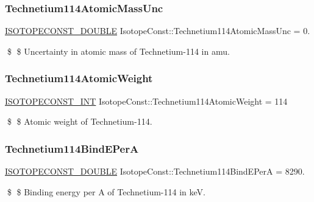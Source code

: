\subsubsection{\texorpdfstring{Technetium114\+Atomic\+Mass\+Unc}{Technetium114AtomicMassUnc}}
{\footnotesize\ttfamily \mbox{\hyperlink{group___isotope_const-_macros_ga8f45a7272ce02c0b4c65c44636ed719a}{I\+S\+O\+T\+O\+P\+E\+C\+O\+N\+S\+T\+\_\+\+D\+O\+U\+B\+LE}} Isotope\+Const\+::\+Technetium114\+Atomic\+Mass\+Unc = 0.}

\$ \$ Uncertainty in atomic mass of Technetium-\/114 in amu. \mbox{\label{group___isotope_const-_technetium-_tc114_ga2d4067e3683a3a5e7e07a7a736ad1bfa}} 
\subsubsection{\texorpdfstring{Technetium114\+Atomic\+Weight}{Technetium114AtomicWeight}}
{\footnotesize\ttfamily \mbox{\hyperlink{group___isotope_const-_macros_ga5f18360b3e99483a35c32d789e62621c}{I\+S\+O\+T\+O\+P\+E\+C\+O\+N\+S\+T\+\_\+\+I\+NT}} Isotope\+Const\+::\+Technetium114\+Atomic\+Weight = 114}

\$ \$ Atomic weight of Technetium-\/114. \mbox{\label{group___isotope_const-_technetium-_tc114_ga669745a9a882065e2579ccd404f3a982}} 
\subsubsection{\texorpdfstring{Technetium114\+Bind\+E\+PerA}{Technetium114BindEPerA}}
{\footnotesize\ttfamily \mbox{\hyperlink{group___isotope_const-_macros_ga8f45a7272ce02c0b4c65c44636ed719a}{I\+S\+O\+T\+O\+P\+E\+C\+O\+N\+S\+T\+\_\+\+D\+O\+U\+B\+LE}} Isotope\+Const\+::\+Technetium114\+Bind\+E\+PerA = 8290.}

\$ \$ Binding energy per A of Technetium-\/114 in keV. \mbox{\label{group___isotope_const-_technetium-_tc114_ga2bfcfef6d5e663339821148191ede347}} 
